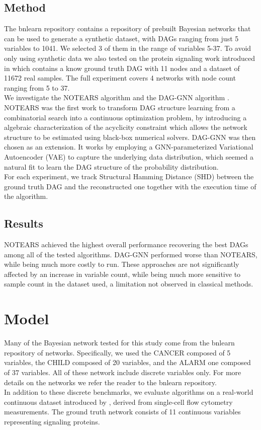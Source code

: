 \documentclass[letterpaper]{article}
\let\savedcite\cite
\let\cite\savedcite
\begin{document}
\subsection{Method}
The bnlearn repository contains a repository of
prebuilt Bayesian networks that can be used to generate a synthetic dataset, with DAGs ranging from
just 5 variables to 1041. We selected 3 of them in the range of variables 5-37.
To avoid only using synthetic data we also tested on the protein signaling
work introduced in \cite{sachs2005causal} which contains a know ground truth DAG with 11 nodes and a dataset of
11672 real samples. The full experiment covers 4 networks with node count ranging from 5 to 37.\\
We investigate the NOTEARS algorithm \cite{zheng2018dags} and the DAG-GNN algorithm
\cite{yu2019daggnn}. NOTEARS was the first work to transform DAG structure learning
from a combinatorial search into a continuous optimization problem,
by introducing a algebraic characterization of the acyclicity constraint 
which allows the network structure to be estimated using black-box
numerical solvers. DAG-GNN was then chosen as an extension. It works by employing
a GNN-parameterized Variational Autoencoder (VAE) to capture the underlying data distribution,
which seemed a natural fit to learn the DAG structure of the probability distribution.\\
For each experiment, we track Structural Hamming Distance (SHD) between the ground truth DAG
and the reconstructed one together with the execution time of the algorithm.\\

\subsection{Results}
NOTEARS achieved the highest overall performance recovering the best DAGs among all of the tested
algorithms. DAG-GNN performed worse than NOTEARS, while being much more costly to run.
These approaches are not significantly affected by an increase in variable count,
while being much more sensitive to sample count in the 
dataset used, a limitation not observed in classical methods.


\section{Model}
Many of the Bayesian network tested for this study come from the bnlearn repository of networks.
Specifically, we used the CANCER composed of 5 variables, the CHILD composed of 20 variables,
and the ALARM one composed of 37 variables. All of these network include discrete variables
only. For more details on the networks we refer the reader to the bnlearn repository.\\
In addition to these discrete benchmarks, we evaluate algorithms on a real-world continuous
dataset introduced by \cite{sachs2005causal}, derived from single-cell flow 
cytometry measurements. The ground truth network consists of 11 continuous variables 
representing signaling proteins.
\end{document}
